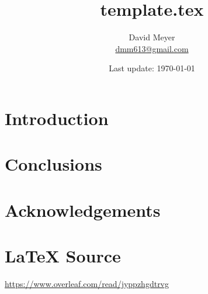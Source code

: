 \documentclass{article}
\title{template.tex}
\author{David Meyer \\ \href{mailto:dmm613@gmail.com}
                            {dmm613@gmail.com}}
\date{Last update: \today}
\theoremstyle{definition}
\begin{document}
\maketitle
%
%
%
\section{Introduction}
%
%
%
%
%
%
%
%
\section{Conclusions}
%
%
%
\section*{Acknowledgements}
%
%
\section*{\LaTeX \hspace{0.10 mm} Source}
\url{https://www.overleaf.com/read/jyppzhgdtrvg}
%
%
%


%
%
\end{document}
